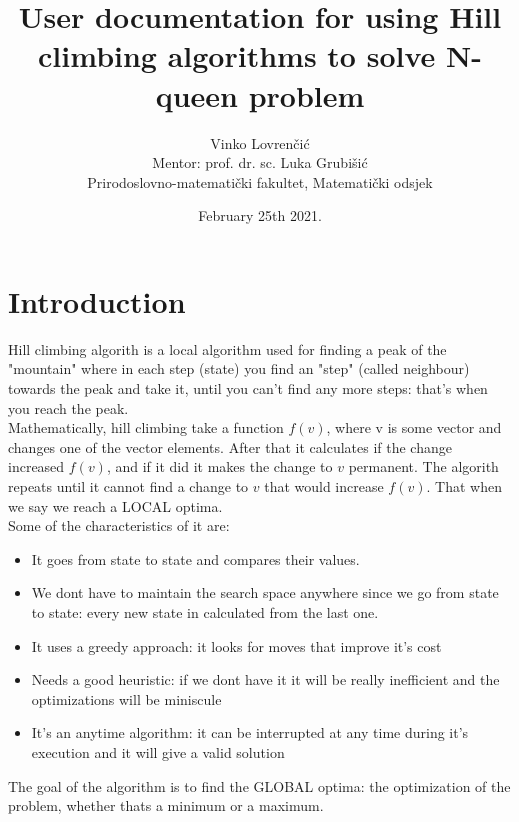 \documentclass[10pt,a4paper]{article}
\author{Vinko Lovrenčić \\ \footnotesize Mentor: prof. dr. sc. Luka Grubišić \\ Prirodoslovno-matematički fakultet, Matematički odsjek}
\date{February 25th 2021.}
\title{User documentation for using Hill climbing algorithms to solve N-queen problem}
\begin{document}
	\begin{titlepage}
                \maketitle
        \end{titlepage}
	\tableofcontents
	\pagebreak
	\section{Introduction}
		Hill climbing algorith is a local algorithm used for finding a peak of the "mountain" where in each step (state) you find an "step" (called neighbour) towards the peak and take it, until you can't find any more steps: that's when you reach the peak. \\
		Mathematically, hill climbing take a function $f(v)$, where v is some vector and changes one of the vector elements. After that it calculates if the change increased $f(v)$, and if it did it makes the change to $v$ permanent. The algorith repeats until it cannot find a change to $v$ that would increase $f(v)$. That when we say we reach a LOCAL optima.\\
		Some of the characteristics of it are:
		\begin{itemize}
			\item It goes from state to state and compares their values.
			\item We dont have to maintain the search space anywhere since we go from state to state: every new state in calculated from the last one.
			\item It uses a greedy approach: it looks for moves that improve it's cost
			\item Needs a good heuristic: if we dont have it it will be really inefficient and the optimizations will be miniscule
			\item It's an anytime algorithm: it can be interrupted at any time during it's execution and it will give a valid solution
		\end{itemize}
		The goal of the algorithm is to find the GLOBAL optima: the optimization of the problem, whether thats a minimum or a maximum.
	\pagebreak
\end{document}
